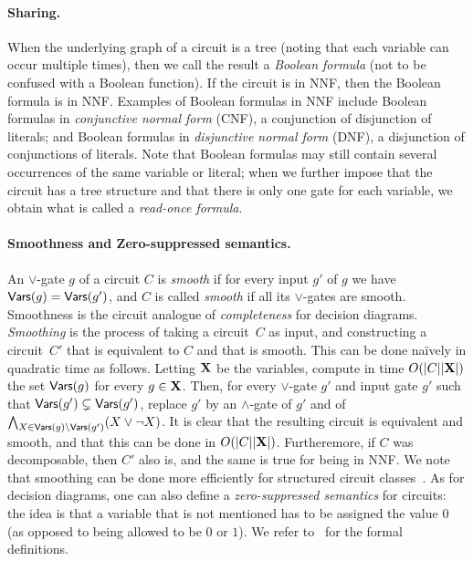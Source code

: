 \paragraph*{Sharing.}
When the underlying graph of a circuit is a tree (noting that each variable
can occur multiple times), then we call the result a \emph{Boolean formula}
(not to be confused with a Boolean function). If the circuit is in NNF,
then the Boolean formula is in NNF. Examples of Boolean formulas in NNF
include Boolean formulas in \emph{conjunctive normal form} (CNF), a
conjunction of disjunction of literals; and Boolean formulas in
\emph{disjunctive normal form} (DNF), a disjunction of conjunctions of
literals. Note that Boolean formulas may still contain several occurrences
of the same variable or literal; when we further impose that the circuit
has a tree structure and that there is only one gate for each variable, we
obtain what is called a \emph{read-once formula}.

\paragraph*{Smoothness and Zero-suppressed semantics.}
An $\lor$-gate $g$ of a circuit $C$ is \emph{smooth} if for every input $g'$ of
$g$ we have $\mathsf{Vars}(g)=\mathsf{Vars}(g')$, and $C$ is called \emph{smooth} if all its
$\lor$-gates are smooth. Smoothness is the circuit analogue of
\emph{completeness} for decision diagrams. \emph{Smoothing} is the process of
taking a circuit~$C$ as input, and constructing a circuit~$C'$ that is
equivalent to $C$ and that is smooth. This can be done naïvely in quadratic
time as follows. Letting $\mathbf{X}$ be the variables, compute in time $O(|C||\mathbf{X}|)$
the set $\mathsf{Vars}(g)$ for every $g\in \mathbf{X}$. Then, for every $\lor$-gate $g'$ and
input gate $g'$ such that $\mathsf{Vars}(g') \subsetneq \mathsf{Vars}(g')$, replace $g'$ by an
$\land$-gate of $g'$ and of $\bigwedge_{X \in \mathsf{Vars}(g)\setminus \mathsf{Vars}(g')} (X
\lor \lnot X)$. It is clear that the resulting circuit is equivalent and
smooth, and that this can be done in $O(|C||\mathbf{X}|)$. Furtheremore, if $C$ was
decomposable, then $C'$ also is, and the same is true for being in NNF. We note
that smoothing can be done more efficiently for structured circuit
classes~\citep{DBLP:conf/nips/ShihBBA19}. As for decision diagrams, one can
also define a \emph{zero-suppressed semantics} for circuits: the idea is that a
variable that is not mentioned has to be assigned the value $0$ (as opposed to
being allowed to be $0$ or $1$). We refer to~\cite{amarilli2017circuit} for the
formal definitions.


